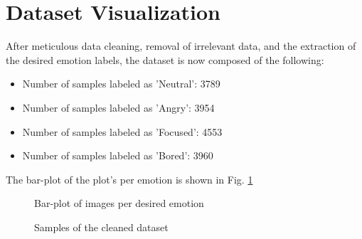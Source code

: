 \section{Dataset Visualization}

After meticulous data cleaning, removal of irrelevant data, and the extraction of the desired emotion labels, the dataset is now composed of the following:

\begin{itemize}
	\item Number of samples labeled as 'Neutral': 3789
	\item Number of samples labeled as 'Angry': 3954
	\item Number of samples labeled as 'Focused': 4553
	\item Number of samples labeled as 'Bored': 3960
\end{itemize}

The bar-plot of the plot's per emotion is shown in Fig. \ref{fig:final_count}

\begin{figure}[h]
	\centering
	
	\caption{Bar-plot of images per desired emotion}
		\label{fig:final_count}
\end{figure}
\begin{figure}[h]
	\centering
	\qquad
	\qquad
	\qquad
	
	\caption{Samples of the cleaned dataset}
\end{figure}
